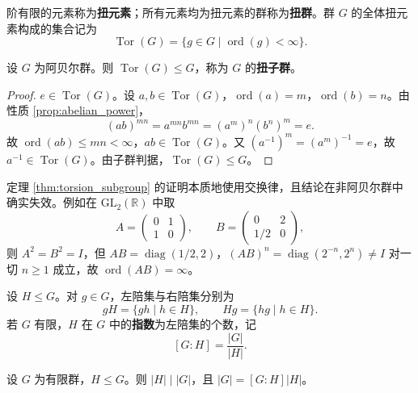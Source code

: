 \begin{definition}[扭元素与扭子群]\label{def:torsion}
阶有限的元素称为\textbf{扭元素}；所有元素均为扭元素的群称为\textbf{扭群}。群 $G$ 的全体扭元素构成的集合记为
\[
\operatorname{Tor}(G)=\{g\in G\mid \operatorname{ord}(g)<\infty\}.
\]
\end{definition}

\begin{theorem}[阿贝尔群的扭元素构成子群]\label{thm:torsion_subgroup}
设 $G$ 为阿贝尔群。则 $\operatorname{Tor}(G)\le G$，称为 $G$ 的\textbf{扭子群}。
\end{theorem}

\begin{proof}
$e\in\operatorname{Tor}(G)$。设 $a,b\in\operatorname{Tor}(G)$，$\operatorname{ord}(a)=m$，$\operatorname{ord}(b)=n$。由性质 \ref{prop:abelian_power}，
\[
(ab)^{mn}=a^{mn}b^{mn}=(a^m)^n(b^n)^m=e.
\]
故 $\operatorname{ord}(ab)\le mn<\infty$，$ab\in\operatorname{Tor}(G)$。又 $(a^{-1})^m=(a^m)^{-1}=e$，故 $a^{-1}\in\operatorname{Tor}(G)$。由子群判据，$\operatorname{Tor}(G)\le G$。
\end{proof}

\begin{remark}[非阿贝尔群中扭元素不封闭]\label{rem:torsion_nonabelian}
定理 \ref{thm:torsion_subgroup} 的证明本质地使用交换律，且结论在非阿贝尔群中确实失效。例如在 $\mathrm{GL}_2(\mathbb{R})$ 中取
\[
A=\begin{pmatrix}0&1\\1&0\end{pmatrix},\qquad
B=\begin{pmatrix}0&2\\1/2&0\end{pmatrix},
\]
则 $A^2=B^2=I$，但 $AB=\operatorname{diag}(1/2,2)$，$(AB)^n=\operatorname{diag}(2^{-n},2^n)\neq I$ 对一切 $n\ge 1$ 成立，故 $\operatorname{ord}(AB)=\infty$。
\end{remark}

\begin{definition}[陪集与指数]\label{def:coset_index}
设 $H\le G$。对 $g\in G$，左陪集与右陪集分别为
\[
gH=\{gh\mid h\in H\},\qquad Hg=\{hg\mid h\in H\}.
\]
若 $G$ 有限，$H$ 在 $G$ 中的\textbf{指数}为左陪集的个数，记
\[
[G:H]=\frac{|G|}{|H|}.
\]
\end{definition}

\begin{lemma}[拉格朗日]\label{lem:lagrange}
设 $G$ 为有限群，$H\le G$。则 $|H|\mid |G|$，且 $|G|=[G:H]|H|$。
\end{lemma}

